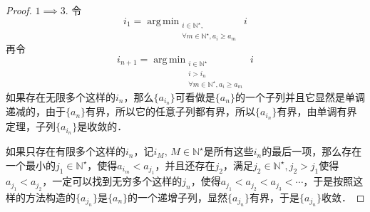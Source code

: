 \documentclass{ctexart}
\theoremstyle{definition}
\theoremstyle{definition}
\theoremstyle{plain}
\theoremstyle{plain}
\theoremstyle{plain}
\theoremstyle{definition}
\DeclareMathOperator*{\argminA}{\mathrm{arg} \,\mathrm{min}}
\newcommand{\nat}{\mathbb{N}^\star}
\begin{document}
\begin{proof}
$1 \implies 3$. 令
\begin{equation}
    i_1 = \argminA_{\substack{i \in \nat, \\ \forall m \in \nat, a_i \geq a_m}} \, i 
\end{equation}
再令
\begin{equation}
    i_{n+1} = \argminA_{\substack{i \in \nat \\ i > i_n \\ \forall m \in \nat, a_i \geq a_m}} \, i
\end{equation}
如果存在无限多个这样的$i_n$，那么$\{ a_{i_n}\}$可看做是$\{a_n\}$的一个子列并且它显然是单调递减的，由于$\{a_n\}$有界，所以它的任意子列都有界，所以$\{a_{i_n}\}$有界，由单调有界定理，子列$\{a_{i_n}\}$是收敛的．

\noindent 如果只存在有限多个这样的$i_n$，记$i_M, \, M \in \nat$是所有这些$i_n$的最后一项，那么存在一个最小的$j_1 \in \nat$，使得$a_{i_m} < a_{j_1}$，并且还存在$j_2$，满足$j_2 \in \nat, j_2 > j_1$使得$a_{j_1} < a_{j_2}$，一定可以找到无穷多个这样的$j_n$，使得$a_{j_1} < a_{j_2} < a_{j_3} < \cdots$，于是按照这样的方法构造的$\{a_{j_n}\}$是$\{a_n \}$的一个递增子列，显然$\{a_{j_n}\}$有界，于是$\{a_{j_n}\}$收敛．
\end{proof}
\end{document}
